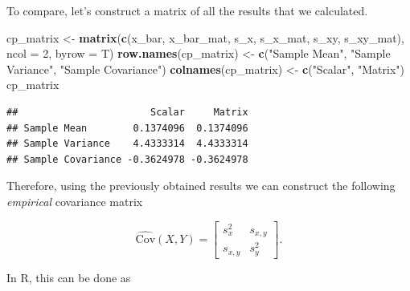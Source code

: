 \documentclass[12pt,]{krantz}
\newenvironment{Shaded}{\begin{snugshade}}{\end{snugshade}}
\newcommand{\KeywordTok}[1]{\textcolor[rgb]{0.27,0.27,0.27}{\textbf{#1}}}
\newcommand{\DataTypeTok}[1]{\textcolor[rgb]{0.27,0.27,0.27}{#1}}
\newcommand{\DecValTok}[1]{\textcolor[rgb]{0.06,0.06,0.06}{#1}}
\newcommand{\StringTok}[1]{\textcolor[rgb]{0.5,0.5,0.5}{#1}}
\newcommand{\CommentTok}[1]{\textcolor[rgb]{0.37,0.37,0.37}{\textit{#1}}}
\newcommand{\OperatorTok}[1]{\textcolor[rgb]{0.43,0.43,0.43}{\textbf{#1}}}
\newcommand{\NormalTok}[1]{#1}
\begin{document}
To compare, let's construct a matrix of all the results that we
calculated.

\begin{Shaded}
\begin{Highlighting}[]
\NormalTok{cp_matrix <-}\StringTok{ }\KeywordTok{matrix}\NormalTok{(}\KeywordTok{c}\NormalTok{(x_bar, x_bar_mat, s_x, s_x_mat, s_xy, s_xy_mat), }\DataTypeTok{ncol =} \DecValTok{2}\NormalTok{, }\DataTypeTok{byrow =}\NormalTok{ T)}
\KeywordTok{row.names}\NormalTok{(cp_matrix) <-}\StringTok{ }\KeywordTok{c}\NormalTok{(}\StringTok{"Sample Mean"}\NormalTok{, }\StringTok{"Sample Variance"}\NormalTok{, }\StringTok{"Sample Covariance"}\NormalTok{)}
\KeywordTok{colnames}\NormalTok{(cp_matrix) <-}\StringTok{ }\KeywordTok{c}\NormalTok{(}\StringTok{"Scalar"}\NormalTok{, }\StringTok{"Matrix"}\NormalTok{)}
\NormalTok{cp_matrix}
\end{Highlighting}
\end{Shaded}

\begin{verbatim}
##                       Scalar     Matrix
## Sample Mean        0.1374096  0.1374096
## Sample Variance    4.4333314  4.4333314
## Sample Covariance -0.3624978 -0.3624978
\end{verbatim}

Therefore, using the previously obtained results we can construct the
following \emph{empirical} covariance matrix

\begin{equation} 
  \widehat{\text{Cov}}(X, Y) =  \left[
\begin{matrix}
s_x^2        & s_{x,y}    \\
s_{x,y}      & s_y^2
\end{matrix}
\right].
\end{equation}

In R, this can be done as

\begin{Shaded}
\end{Shaded}
\end{document}
